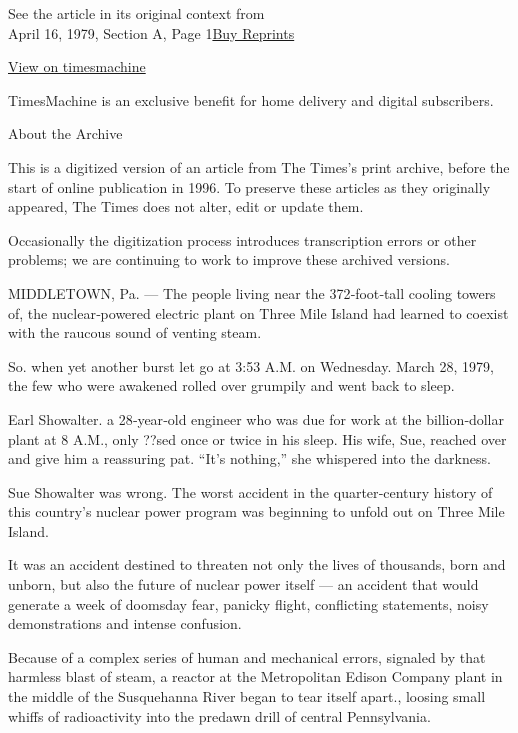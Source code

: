 See the article in its original context from\\
April 16, 1979, Section A, Page
1\href{https://store.nytimes3xbfgragh.onion/collections/new-york-times-page-reprints?utm_source=nytimes\&utm_medium=article-page\&utm_campaign=reprints}{Buy
Reprints}

\href{http://timesmachine.nytimes3xbfgragh.onion/timesmachine/1979/04/16/112104648.html}{View
on timesmachine}

TimesMachine is an exclusive benefit for home delivery and digital
subscribers.

About the Archive

This is a digitized version of an article from The Times's print
archive, before the start of online publication in 1996. To preserve
these articles as they originally appeared, The Times does not alter,
edit or update them.

Occasionally the digitization process introduces transcription errors or
other problems; we are continuing to work to improve these archived
versions.

MIDDLETOWN, Pa. --- The people living near the 372‐foot‐tall cooling
towers of, the nuclear‐powered electric plant on Three Mile Island had
learned to coexist with the raucous sound of venting steam.

So. when yet another burst let go at 3:53 A.M. on Wednesday. March 28,
1979, the few who were awakened rolled over grumpily and went back to
sleep.

Earl Showalter. a 28‐year‐old engineer who was due for work at the
billion‐dollar plant at 8 A.M., only ??sed once or twice in his sleep.
His wife, Sue, reached over and give him a reassuring pat. ``It's
nothing,'' she whispered into the darkness.

Sue Showalter was wrong. The worst accident in the quarter‐century
history of this country's nuclear power program was beginning to unfold
out on Three Mile Island.

It was an accident destined to threaten not only the lives of thousands,
born and unborn, but also the future of nuclear power itself --- an
accident that would generate a week of doomsday fear, panicky flight,
conflicting statements, noisy demonstrations and intense confusion.

Because of a complex series of human and mechanical errors, signaled by
that harmless blast of steam, a reactor at the Metropolitan Edison
Company plant in the middle of the Susquehanna River began to tear
itself apart., loosing small whiffs of radioactivity into the predawn
drill of central Pennsylvania.

